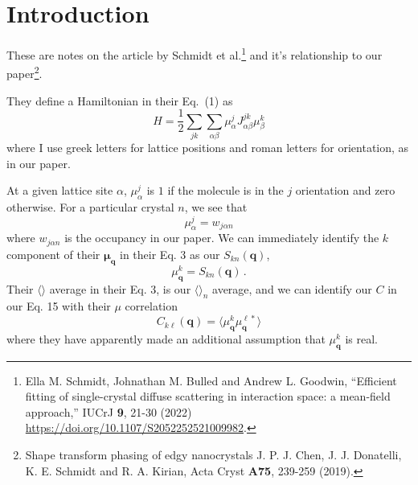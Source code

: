 \documentclass[12pt]{article}
\begin{document}
\let\xxxhat\hat
\let\xxxvec\vec
\renewcommand{\hat}[1]{{\boldsymbol {\xxxhat {#1}} }}
\renewcommand{\vec}[1]{\boldsymbol {#1}}


\section{Introduction}
These are
notes on the article by Schmidt et al.\footnote{
Ella M. Schmidt, Johnathan M. Bulled and Andrew L. Goodwin,
 ``Efficient fitting of single-crystal diffuse scattering in
interaction space: a mean-field approach,'' IUCrJ {\bf 9}, 21-30 (2022)
\url{https://doi.org/10.1107/S2052252521009982}.
}
and it's relationship to our paper\footnote{
Shape transform phasing of edgy nanocrystals
J. P. J. Chen, J. J. Donatelli, K. E. Schmidt and R. A. Kirian,
Acta Cryst {\bf A75}, 239-259 (2019).
}.


They define a Hamiltonian in their Eq.\ (1) as
\begin{equation}
H = \frac{1}{2} \sum_{jk} \sum_{\alpha\beta} \mu^j_\alpha J_{\alpha\beta}^{jk}
\mu_\beta^k
\end{equation}
where I use
greek letters for lattice positions and roman letters for orientation,
as in our paper.

At a given lattice site $\alpha$, $\mu_\alpha^j$
is $1$ if the molecule is in the $j$
orientation and zero otherwise. For a particular crystal $n$, we see that
\begin{equation}
\mu^j_\alpha = w_{j\alpha n}
\end{equation}
where $w_{j\alpha n}$ is the occupancy in our paper. We can immediately
identify the $k$ component of their $\vec \mu_{\vec q}$ in their Eq. 3
as our $S_{kn}(\vec q)$,
\begin{equation}
\mu^k_{\vec q} = S_{kn}(\vec q) \,.
\end{equation}
Their $\langle \rangle$ average in their Eq. 3, is our $\langle \rangle_n$
average, and we can identify our $C$ in our Eq. 15
with their $\mu$ correlation
\begin{equation}
C_{k\ell}(\vec q) = \langle \mu^{k}_{\vec q} \mu^{\ell *}_{\vec q}\rangle
\end{equation}
where they have apparently made an additional assumption that 
$\mu^k_{\vec q}$ is real.
\end{document}
